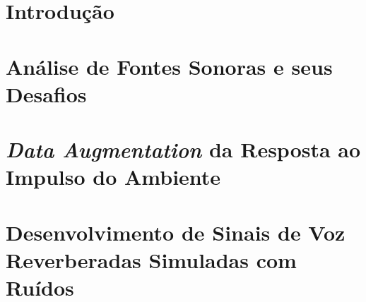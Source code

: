 \documentclass[a4paper,12pt,oneside,openany]{book}
\begin{document}
\frontmatter
\thispagestyle{empty}



\pagebreak            



\tableofcontents
\listoffigures
\listoftables

\mainmatter
\cleardoublepage
\chapter{Introdução}
\label{cap1}


\chapter{Análise de Fontes Sonoras e seus Desafios}
\label{cap2}


\chapter{\textit{Data Augmentation} da Resposta ao Impulso do Ambiente}
\label{cap3}


\chapter{Desenvolvimento de Sinais de Voz Reverberadas Simuladas com Ruídos}
\label{cap4}

\end{document}
